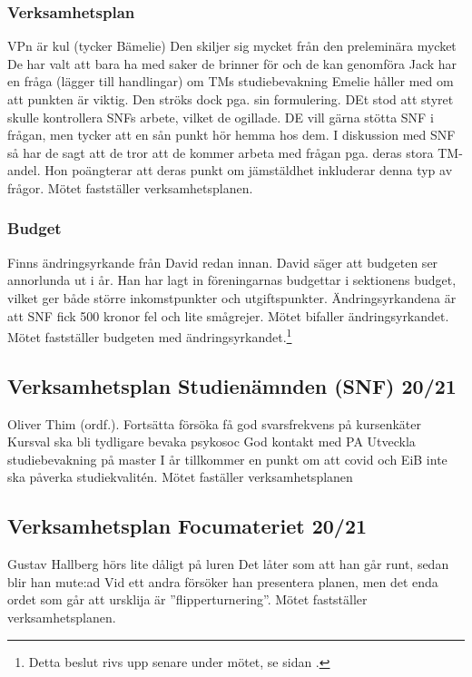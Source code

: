 \documentclass[hidelinks]{../sektionsmote} %
\begin{document}
\subsubsection{Verksamhetsplan}
VPn är kul (tycker Bämelie)
Den skiljer sig mycket från den preleminära mycket
De har valt att bara ha med saker de brinner för och de kan genomföra
Jack har en fråga (lägger till handlingar) om TMs studiebevakning
Emelie håller med om att punkten är viktig. Den ströks dock pga. sin formulering. DEt stod att styret skulle kontrollera SNFs arbete, vilket de ogillade. DE vill gärna stötta SNF i frågan, men tycker att en sån punkt hör hemma hos dem.
I diskussion med SNF så har de sagt att de tror att de kommer arbeta med frågan pga. deras stora TM-andel.
Hon poängterar att deras punkt om jämstäldhet inkluderar denna typ av frågor.
Mötet fastställer verksamhetsplanen.

\subsubsection{Budget}
Finns ändringsyrkande från David redan innan.
David säger att budgeten ser annorlunda ut i år.
Han har lagt in föreningarnas budgettar i sektionens budget, vilket ger både större inkomstpunkter och utgiftspunkter.
Ändringsyrkandena är att SNF fick 500 kronor fel och lite smågrejer.
Mötet bifaller ändringsyrkandet.
Mötet fastställer budgeten med ändringsyrkandet.\footnote{Detta beslut rivs upp senare under mötet, se sidan \pageref{uppriven-budget}.}

\subsection{Verksamhetsplan Studienämnden (SNF) 20/21}
Oliver Thim (ordf.).
Fortsätta försöka få god svarsfrekvens på kursenkäter
Kursval ska bli tydligare
bevaka psykosoc
God kontakt med PA
Utveckla studiebevakning på master
I år tillkommer en punkt om att covid och EiB inte ska påverka studiekvalitén.
Mötet faställer verksamhetsplanen
    
\subsection{Verksamhetsplan Focumateriet 20/21}
Gustav Hallberg hörs lite dåligt på luren
Det låter som att han går runt, sedan blir han mute:ad
Vid ett andra försöker han presentera planen, men det enda ordet som går att ursklija är ''flipperturnering''.
Mötet fastställer verksamhetsplanen.
\end{document}
